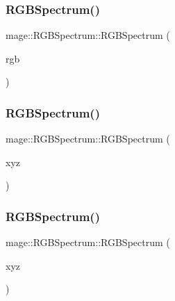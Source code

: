 \hypertarget{structmage_1_1_r_g_b_spectrum_a866ef0a3fe393f853d969e00a4c02086}{}\label{structmage_1_1_r_g_b_spectrum_a866ef0a3fe393f853d969e00a4c02086} 
\subsubsection{\texorpdfstring{R\+G\+B\+Spectrum()}{RGBSpectrum()}\hspace{0.1cm}{\footnotesize\ttfamily [4/8]}}
{\footnotesize\ttfamily mage\+::\+R\+G\+B\+Spectrum\+::\+R\+G\+B\+Spectrum (\begin{DoxyParamCaption}\item[{\hyperlink{structmage_1_1_r_g_b_spectrum}{R\+G\+B\+Spectrum} \&\&}]{rgb }\end{DoxyParamCaption})}

\hypertarget{structmage_1_1_r_g_b_spectrum_a7c87ee10a81c55b1954915c1abea0cb9}{}\label{structmage_1_1_r_g_b_spectrum_a7c87ee10a81c55b1954915c1abea0cb9} 
\subsubsection{\texorpdfstring{R\+G\+B\+Spectrum()}{RGBSpectrum()}\hspace{0.1cm}{\footnotesize\ttfamily [5/8]}}
{\footnotesize\ttfamily mage\+::\+R\+G\+B\+Spectrum\+::\+R\+G\+B\+Spectrum (\begin{DoxyParamCaption}\item[{const \hyperlink{structmage_1_1_x_y_z_spectrum}{X\+Y\+Z\+Spectrum} \&}]{xyz }\end{DoxyParamCaption})}

\hypertarget{structmage_1_1_r_g_b_spectrum_ad3307598d8156374483f66c0d3492b90}{}\label{structmage_1_1_r_g_b_spectrum_ad3307598d8156374483f66c0d3492b90} 
\subsubsection{\texorpdfstring{R\+G\+B\+Spectrum()}{RGBSpectrum()}\hspace{0.1cm}{\footnotesize\ttfamily [6/8]}}
{\footnotesize\ttfamily mage\+::\+R\+G\+B\+Spectrum\+::\+R\+G\+B\+Spectrum (\begin{DoxyParamCaption}\item[{\hyperlink{structmage_1_1_x_y_z_spectrum}{X\+Y\+Z\+Spectrum} \&\&}]{xyz }\end{DoxyParamCaption})}

